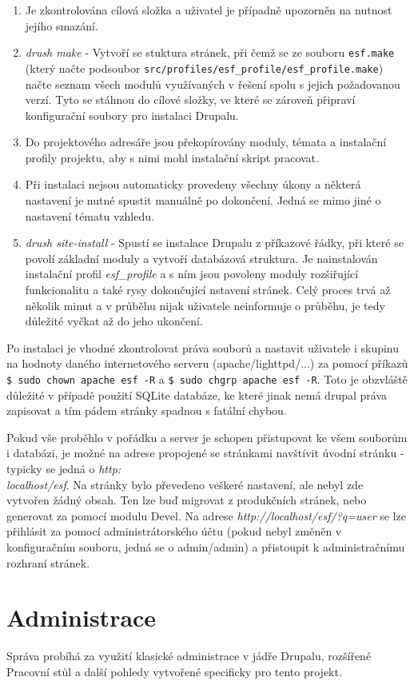 \begin{enumerate}
  \item Je zkontrolována cílová složka a uživatel je případně upozorněn na nutnost jejího smazání.
  \item \emph{drush make} - Vytvoří se stuktura stránek, při čemž se ze souboru \texttt{esf.make} (který načte podsoubor \texttt{src/profiles/esf\_profile/esf\_profile.make}) načte seznam všech modulů využívaných v řešení spolu s jejich požadovanou verzí. Tyto se stáhnou do cílové složky, ve které se zároveň připraví konfigurační soubory pro instalaci Drupalu.
  \item Do projektového adresáře jsou překopírovány moduly, témata a instalační profily projektu, aby s nimi mohl instalační skript pracovat.
  \item Při instalaci nejsou automaticky provedeny všechny úkony a některá nastavení je nutné spustit manuálně po dokončení. Jedná se mimo jiné o nastavení tématu vzhledu.
  \item \emph{drush site-install} - Spustí se instalace Drupalu z příkazové řádky, při které se povolí základní moduly a vytvoří databázová struktura. Je nainstalován instalační profil \emph{esf\_profile} a s ním jsou povoleny moduly rozšiřující funkcionalitu a také rysy dokončující nstavení stránek. Celý proces trvá až několik minut a v průběhu nijak uživatele neinformuje o průběhu, je tedy důležité vyčkat až do jeho ukončení.
\end{enumerate}

Po instalaci je vhodné zkontrolovat práva souborů a nastavit uživatele i skupinu na hodnoty daného internetového serveru (apache/lighttpd/...) za pomocí příkazů \texttt{\$~sudo~chown~apache~esf~-R} a \texttt{\$~sudo~chgrp~apache~esf~-R}. Toto je obzvláště důležité v případě použití SQLite databáze, ke které jinak nemá drupal práva zapisovat a tím pádem stránky spadnou s fatální chybou. 

Pokud vše proběhlo v pořádku a server je schopen přistupovat ke všem souborům i databázi, je možné na adrese propojené se stránkami navštívit úvodní stránku - typicky se jedná o \emph{http:\\localhost/esf}. Na stránky bylo převedeno veškeré nastavení, ale nebyl zde vytvořen žádný obsah. Ten lze buď migrovat z produkčních stránek, nebo generovat za pomocí modulu Devel. Na adrese \emph{http://localhost/esf/?q=user} se lze přihlásit za pomocí administrátorského účtu (pokud nebyl změněn v konfiguračním souboru, jedná se o admin/admin) a přistoupit k administračnímu rozhraní stránek.

\section{Administrace}
Správa probíhá za využití klasické administrace v jádře Drupalu, rozšířené Pracovní stůl a další pohledy vytvořené specificky pro tento projekt. 
